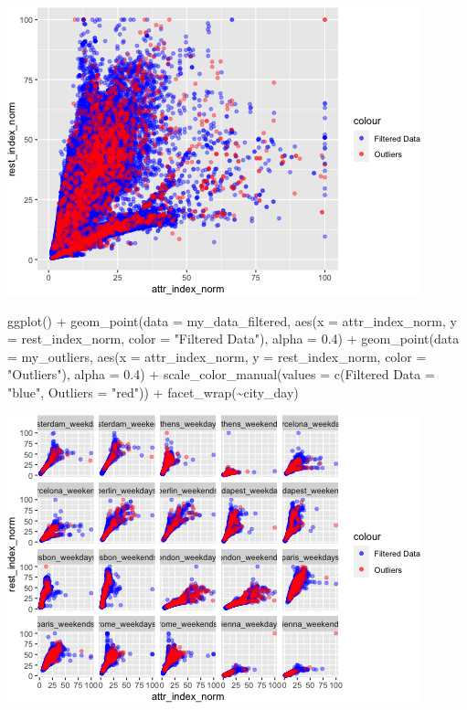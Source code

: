 \documentclass[
]{article}
\newenvironment{Shaded}{\begin{snugshade}}{\end{snugshade}}
\newcommand{\AttributeTok}[1]{\textcolor[rgb]{0.77,0.63,0.00}{#1}}
\newcommand{\FloatTok}[1]{\textcolor[rgb]{0.00,0.00,0.81}{#1}}
\newcommand{\FunctionTok}[1]{\textcolor[rgb]{0.00,0.00,0.00}{#1}}
\newcommand{\NormalTok}[1]{#1}
\newcommand{\OtherTok}[1]{\textcolor[rgb]{0.56,0.35,0.01}{#1}}
\newcommand{\SpecialCharTok}[1]{\textcolor[rgb]{0.00,0.00,0.00}{#1}}
\newcommand{\StringTok}[1]{\textcolor[rgb]{0.31,0.60,0.02}{#1}}
\begin{document}
\includegraphics{Project_files/figure-latex/unnamed-chunk-36-1.png}

\begin{Shaded}
\begin{Highlighting}[]
\FunctionTok{ggplot}\NormalTok{() }\SpecialCharTok{+} \FunctionTok{geom\_point}\NormalTok{(}\AttributeTok{data =}\NormalTok{ my\_data\_filtered, }\FunctionTok{aes}\NormalTok{(}\AttributeTok{x =}\NormalTok{ attr\_index\_norm,}
    \AttributeTok{y =}\NormalTok{ rest\_index\_norm, }\AttributeTok{color =} \StringTok{"Filtered Data"}\NormalTok{), }\AttributeTok{alpha =} \FloatTok{0.4}\NormalTok{) }\SpecialCharTok{+}
    \FunctionTok{geom\_point}\NormalTok{(}\AttributeTok{data =}\NormalTok{ my\_outliers, }\FunctionTok{aes}\NormalTok{(}\AttributeTok{x =}\NormalTok{ attr\_index\_norm, }\AttributeTok{y =}\NormalTok{ rest\_index\_norm,}
        \AttributeTok{color =} \StringTok{"Outliers"}\NormalTok{), }\AttributeTok{alpha =} \FloatTok{0.4}\NormalTok{) }\SpecialCharTok{+} \FunctionTok{scale\_color\_manual}\NormalTok{(}\AttributeTok{values =} \FunctionTok{c}\NormalTok{(}\StringTok{\textasciigrave{}}\AttributeTok{Filtered Data}\StringTok{\textasciigrave{}} \OtherTok{=} \StringTok{"blue"}\NormalTok{,}
    \AttributeTok{Outliers =} \StringTok{"red"}\NormalTok{)) }\SpecialCharTok{+} \FunctionTok{facet\_wrap}\NormalTok{(}\SpecialCharTok{\textasciitilde{}}\NormalTok{city\_day)}
\end{Highlighting}
\end{Shaded}

\includegraphics{Project_files/figure-latex/unnamed-chunk-36-2.png}
\end{document}
